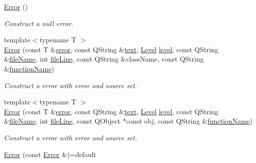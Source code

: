 \begin{DoxyCompactItemize}
\item 
\hyperlink{class_mdt_1_1_error_af7cd5683888bc46f9a484670f02520d5}{Error} ()\hypertarget{class_mdt_1_1_error_af7cd5683888bc46f9a484670f02520d5}{}\label{class_mdt_1_1_error_af7cd5683888bc46f9a484670f02520d5}

\begin{DoxyCompactList}\small\item\em Construct a null error. \end{DoxyCompactList}\item 
{\footnotesize template$<$typename T $>$ }\\\hyperlink{class_mdt_1_1_error_ad12894ddf0783443f8351371b701ca89}{Error} (const T \&\hyperlink{class_mdt_1_1_error_a0d042250a76d0351b8c19367572f5e11}{error}, const Q\+String \&\hyperlink{class_mdt_1_1_error_a99327678615e8f2bddd22cd59482bfc2}{text}, \hyperlink{class_mdt_1_1_error_ab533dc690f68a8635232db594194a068}{Level} \hyperlink{class_mdt_1_1_error_a9c73117a49791ab87163b815d6a3e0c9}{level}, const Q\+String \&\hyperlink{class_mdt_1_1_error_a5f7cdab03c2c0955693ace234039cd53}{file\+Name}, int \hyperlink{class_mdt_1_1_error_a5b887edc31341eb23557905e7a2d69ae}{file\+Line}, const Q\+String \&class\+Name, const Q\+String \&\hyperlink{class_mdt_1_1_error_a5706a74669219d9672ee20414f805cab}{function\+Name})
\begin{DoxyCompactList}\small\item\em Construct a error with error and source set. \end{DoxyCompactList}\item 
{\footnotesize template$<$typename T $>$ }\\\hyperlink{class_mdt_1_1_error_a8643711dcae19d29e332b10b5420dd21}{Error} (const T \&\hyperlink{class_mdt_1_1_error_a0d042250a76d0351b8c19367572f5e11}{error}, const Q\+String \&\hyperlink{class_mdt_1_1_error_a99327678615e8f2bddd22cd59482bfc2}{text}, \hyperlink{class_mdt_1_1_error_ab533dc690f68a8635232db594194a068}{Level} \hyperlink{class_mdt_1_1_error_a9c73117a49791ab87163b815d6a3e0c9}{level}, const Q\+String \&\hyperlink{class_mdt_1_1_error_a5f7cdab03c2c0955693ace234039cd53}{file\+Name}, int \hyperlink{class_mdt_1_1_error_a5b887edc31341eb23557905e7a2d69ae}{file\+Line}, const Q\+Object $\ast$const obj, const Q\+String \&\hyperlink{class_mdt_1_1_error_a5706a74669219d9672ee20414f805cab}{function\+Name})
\begin{DoxyCompactList}\small\item\em Construct a error with error and source set. \end{DoxyCompactList}\item 
\hyperlink{class_mdt_1_1_error_a7d7baf19eba7c6f5fb446a919fe8ee41}{Error} (const \hyperlink{class_mdt_1_1_error}{Error} \&)=default\hypertarget{class_mdt_1_1_error_a7d7baf19eba7c6f5fb446a919fe8ee41}{}\label{class_mdt_1_1_error_a7d7baf19eba7c6f5fb446a919fe8ee41}


\end{DoxyCompactItemize}
